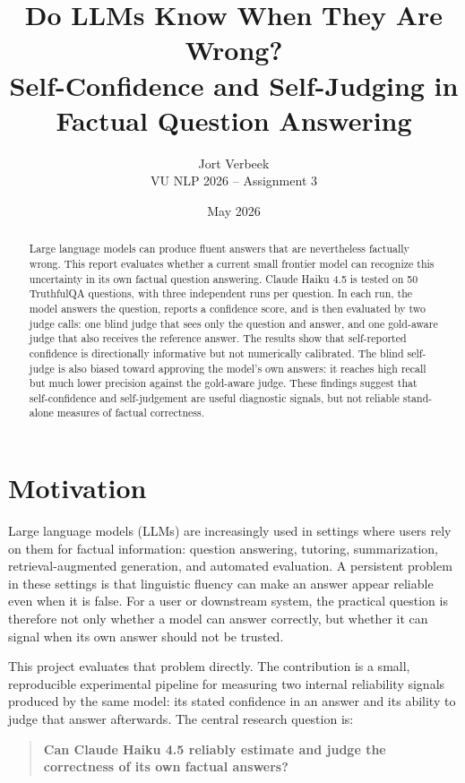\documentclass[11pt,a4paper]{article}
\title{\textbf{Do LLMs Know When They Are Wrong?}\\
\large Self-Confidence and Self-Judging in Factual Question Answering}
\author{Jort Verbeek\\
VU NLP 2026 -- Assignment 3}
\date{May 2026}
\begin{document}
\maketitle

\begin{abstract}
Large language models can produce fluent answers that are nevertheless factually wrong. This report evaluates whether a current small frontier model can recognize this uncertainty in its own factual question answering. Claude Haiku 4.5 is tested on 50 TruthfulQA questions, with three independent runs per question. In each run, the model answers the question, reports a confidence score, and is then evaluated by two judge calls: one blind judge that sees only the question and answer, and one gold-aware judge that also receives the reference answer. The results show that self-reported confidence is directionally informative but not numerically calibrated. The blind self-judge is also biased toward approving the model's own answers: it reaches high recall but much lower precision against the gold-aware judge. These findings suggest that self-confidence and self-judgement are useful diagnostic signals, but not reliable stand-alone measures of factual correctness.
\end{abstract}

\section{Motivation}

Large language models (LLMs) are increasingly used in settings where users rely on them for factual information: question answering, tutoring, summarization, retrieval-augmented generation, and automated evaluation. A persistent problem in these settings is that linguistic fluency can make an answer appear reliable even when it is false. For a user or downstream system, the practical question is therefore not only whether a model can answer correctly, but whether it can signal when its own answer should not be trusted.

This project evaluates that problem directly. The contribution is a small, reproducible experimental pipeline for measuring two internal reliability signals produced by the same model: its stated confidence in an answer and its ability to judge that answer afterwards. The central research question is:

\begin{quote}
\textbf{Can Claude Haiku 4.5 reliably estimate and judge the correctness of its own factual answers?}
\end{quote}
\end{document}
